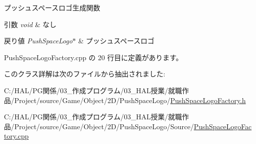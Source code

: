 プッシュスペースロゴ生成関数 


\begin{DoxyParams}{引数}
{\em void} & なし \\
\hline
\end{DoxyParams}

\begin{DoxyRetVals}{戻り値}
{\em Push\+Space\+Logo$\ast$} & プッシュスペースロゴ \\
\hline
\end{DoxyRetVals}


 Push\+Space\+Logo\+Factory.\+cpp の 20 行目に定義があります。



このクラス詳解は次のファイルから抽出されました\+:\begin{DoxyCompactItemize}
\item 
C\+:/\+H\+A\+L/\+P\+G関係/03\+\_\+作成プログラム/03\+\_\+\+H\+A\+L授業/就職作品/\+Project/source/\+Game/\+Object/2\+D/\+Push\+Space\+Logo/\mbox{\hyperlink{_push_space_logo_factory_8h}{Push\+Space\+Logo\+Factory.\+h}}\item 
C\+:/\+H\+A\+L/\+P\+G関係/03\+\_\+作成プログラム/03\+\_\+\+H\+A\+L授業/就職作品/\+Project/source/\+Game/\+Object/2\+D/\+Push\+Space\+Logo/\+Source/\mbox{\hyperlink{_push_space_logo_factory_8cpp}{Push\+Space\+Logo\+Factory.\+cpp}}\end{DoxyCompactItemize}
